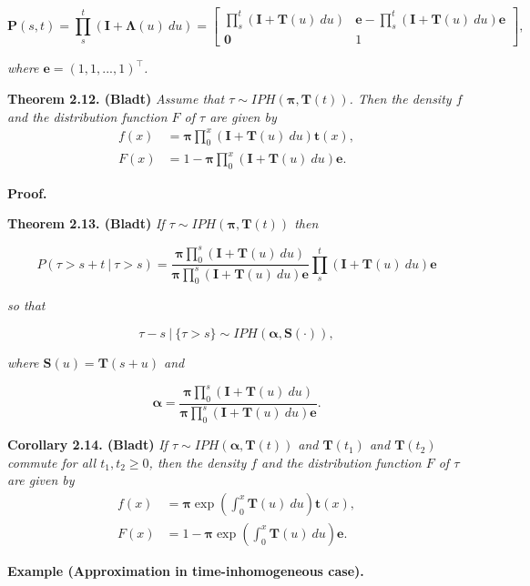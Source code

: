 \documentclass[
]{book}
\begin{document}
\[
\mathbf{P}(s,t)=\prod_s^t(\mathbf{I}+\mathbf{\Lambda}(u)\ du)=
\begin{bmatrix}
\prod_s^t(\mathbf{I}+\mathbf{T}(u)\ du) & \mathbf{e} -\prod_s^t(\mathbf{I}+\mathbf{T}(u)\ du)\mathbf{e}\\
\mathbf{0} & 1
\end{bmatrix},
\]

\emph{where \(\mathbf{e}=(1,1,...,1)^\top\).}

\textbf{Theorem 2.12. (Bladt)} \emph{Assume that \(\tau \sim IPH(\mathbf{\pi},\mathbf{T}(t))\). Then the density \(f\) and the distribution function \(F\) of \(\tau\) are given by}
\begin{align*}
f(x)&=\mathbf{\pi}\prod_0^x(\mathbf{I}+\mathbf{T}(u)\ du)\mathbf{t}(x),\\
F(x)&=1-\mathbf{\pi}\prod_0^x(\mathbf{I}+\mathbf{T}(u)\ du)\mathbf{e}.
\end{align*}

\textbf{Proof.}

\textbf{Theorem 2.13. (Bladt)} \emph{If \(\tau \sim IPH(\mathbf{\pi},\mathbf{T}(t))\) then}

\[
P(\tau >s+t\ \vert\ \tau >s)=\frac{\mathbf{\pi}\prod_0^s(\mathbf{I}+\mathbf{T}(u)\ du)}{\mathbf{\pi}\prod_0^s(\mathbf{I}+\mathbf{T}(u)\ du)\mathbf{e}}\prod_s^t(\mathbf{I}+\mathbf{T}(u)\ du)\mathbf{e}
\]

\emph{so that}

\[
\tau-s\ \vert\ \{\tau>s\}\sim IPH(\mathbf{\alpha},\mathbf{S}(\cdot)),
\]

\emph{where \(\mathbf{S}(u)=\mathbf{T}(s+u)\) and }

\[
\mathbf{\alpha}=\frac{\mathbf{\pi}\prod_0^s(\mathbf{I}+\mathbf{T}(u)\ du)}{\mathbf{\pi}\prod_0^s(\mathbf{I}+\mathbf{T}(u)\ du)\mathbf{e}}.
\]

\textbf{Corollary 2.14. (Bladt)} \emph{If \(\tau\sim IPH(\mathbf{\alpha},\mathbf{T}(t))\) and \(\mathbf{T}(t_1)\) and \(\mathbf{T}(t_2)\) commute for all \(t_1,t_2\ge 0\), then the density \(f\) and the distribution function \(F\) of \(\tau\) are given by}
\begin{align*}
f(x)&=\mathbf{\pi}\exp\left(\int_0^x\mathbf{T}(u)\ du\right)\mathbf{t}(x),\\
F(x)&=1-\mathbf{\pi}\exp\left(\int_0^x\mathbf{T}(u)\ du\right)\mathbf{e}.
\end{align*}

\textbf{Example (Approximation in time-inhomogeneous case).}
\end{document}
